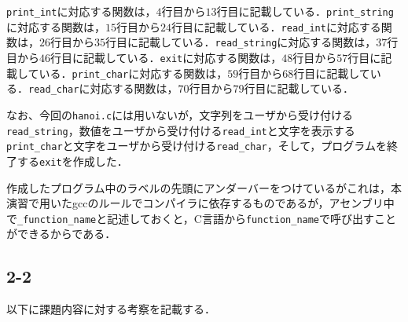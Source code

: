 \documentclass[a4j,11pt]{jarticle}
\begin{document}
\verb|print_int|に対応する関数は，$4$行目から$13$行目に記載している．\verb|print_string|に対応する関数は，$15$行目から$24$行目に記載している．\verb|read_int|に対応する関数は，$26$行目から$35$行目に記載している．\verb|read_string|に対応する関数は，$37$行目から$46$行目に記載している．\verb|exit|に対応する関数は，$48$行目から$57$行目に記載している．\verb|print_char|に対応する関数は，$59$行目から$68$行目に記載している．\verb|read_char|に対応する関数は，$70$行目から$79$行目に記載している．

なお、今回の\verb|hanoi.c|には用いないが，文字列をユーザから受け付ける\verb|read_string|，数値をユーザから受け付ける\verb|read_int|と文字を表示する\verb|print_char|と文字をユーザから受け付ける\verb|read_char|，そして，プログラムを終了する\verb|exit|を作成した．
  
作成したプログラム中のラベルの先頭にアンダーバーをつけているがこれは，本演習で用いたgccのルールでコンパイラに依存するものであるが，アセンブリ中で\verb|_function_name|と記述しておくと，C言語から\verb|function_name|で呼び出すことができるからである．

 \subsection{2-2}
以下に課題内容に対する考察を記載する．
\end{document}
